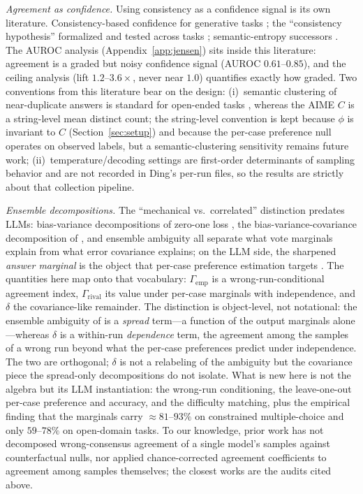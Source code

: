 \documentclass[a4paper,fleqn]{cas-sc}
\newcommand{\agreementIndex}{\Gamma}
\begin{document}
\emph{Agreement as confidence.}
Using consistency as a confidence signal is its own literature.
Consistency-based confidence for generative tasks
\cite{manakul2023,kuhn2023,farquhar2024}; the ``consistency hypothesis'' formalized and tested across tasks \cite{xiao2025}; semantic-entropy successors \cite{nguyen2025}. The AUROC analysis (Appendix~\ref{app:jensen}) sits inside this
literature: agreement is a graded but noisy confidence signal
(AUROC $0.61$--$0.85$), and the ceiling analysis (lift $1.2$--$3.6\times$,
never near $1.0$) quantifies exactly how graded. Two conventions from
this literature bear on the design: (i)~semantic clustering of
near-duplicate answers is standard for open-ended tasks
\cite{kuhn2023,farquhar2024}, whereas the AIME $C$ is a string-level mean distinct count; the string-level convention is kept
because $\phi$ is invariant to $C$ (Section~\ref{sec:setup}) and because
the per-case preference null operates on observed labels, but a
semantic-clustering sensitivity remains future work;
(ii)~temperature/decoding settings are first-order determinants of
sampling behavior and are not recorded in Ding's per-run files, so the results are strictly about that collection pipeline.

\emph{Ensemble decompositions.}
The ``mechanical vs.\ correlated'' distinction predates LLMs: bias-variance
decompositions of zero-one loss \cite{kohavi1996}, the bias-variance-covariance
decomposition of \cite{ueda1996}, and ensemble ambiguity
\cite{krogh1995} all separate what vote marginals explain from what
error covariance explains; on the LLM side, the sharpened \emph{answer marginal} is the object that per-case preference estimation targets \cite{arzhantsev2026}. The quantities here map onto that vocabulary:
$\agreementIndex_{\mathrm{emp}}$ is a wrong-run-conditional agreement index,
$\agreementIndex_{\mathrm{rival}}$ its value under per-case marginals with
independence, and $\delta$ the covariance-like remainder. The distinction is
object-level, not notational: the ensemble ambiguity of \cite{krogh1995} is a
\emph{spread} term---a function of the output marginals alone---whereas
$\delta$ is a within-run \emph{dependence} term, the agreement among the
samples of a wrong run beyond what the per-case preferences predict under
independence. The two are orthogonal; $\delta$ is not a relabeling of the
ambiguity but the covariance piece the spread-only decompositions do not
isolate. What is new
here is not the algebra but its LLM instantiation: the
wrong-run conditioning, the leave-one-out per-case preference and
accuracy, and the difficulty matching, plus the empirical finding that
the marginals carry $\approx81$--$93\%$ on constrained multiple-choice
and only $59$--$78\%$ on open-domain tasks. To our knowledge, prior work has not decomposed wrong-consensus agreement of a single model's samples against counterfactual nulls, nor applied chance-corrected agreement coefficients to agreement among samples themselves; the closest works are the audits cited above.
\end{document}
